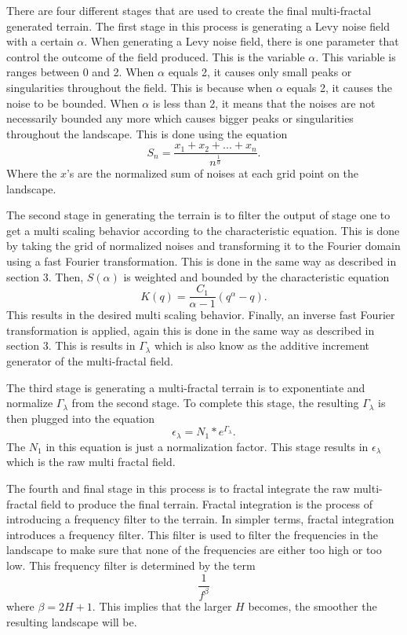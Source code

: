 \documentclass[11pt,twocolumn]{article}
\begin{document}
	There are four different stages that are used to create the final multi-fractal generated terrain. The first stage in this process is
	generating a Levy noise field with a certain $\alpha$. When generating a Levy noise field, there is one parameter that
	control the outcome of the field produced. This is the variable $\alpha$. This variable is ranges between 0 and 2.
	When $\alpha$ equals 2, it causes only small peaks or singularities throughout the field. This is because when $\alpha$ equals 2,
	it causes the noise to be bounded. When $\alpha$ is less than 2, it means that the noises are not necessarily
	bounded any more which causes bigger peaks or singularities throughout the landscape.
	This is done using the equation
	\begin{equation}
	{S_{n}} = \frac{{x_{1}} + {x_{2}} + ... + {x_{n}}}{n^{\frac{1}{\alpha}}}.
	\end{equation}
	Where the $x$'s are the normalized sum of noises at each grid point on the landscape.
	
	The second stage in generating the terrain is to filter the output of stage one to get a multi scaling behavior according to the
	characteristic equation. This is done by taking the grid of normalized noises and transforming it to the Fourier domain using a
	fast Fourier transformation. This is done in the same way as described in section 3. Then, $S(\alpha)$ is weighted and
	bounded by the characteristic equation
	\begin{equation}
	K(q) = \frac{C_{1}}{\alpha - 1}\left(q^{\alpha} - q\right).
	\end{equation}
	 This results in the
	desired multi scaling behavior. Finally, an inverse fast Fourier transformation is applied, again this is done in the same
	way as described in section 3. This is results in $\Gamma_{\lambda}$ which is also know as the additive increment generator of
	the multi-fractal field.
	
	The third stage is generating a multi-fractal terrain is to exponentiate and normalize $\Gamma_{\lambda}$ from the second stage.
	To complete this stage, the resulting $\Gamma_\lambda$ is then plugged into the equation
	\begin{equation}
	{\epsilon_{\lambda}} = {N_{1}} * e^{{\Gamma_{\lambda}}}.
	\end{equation}
	The $N_{1}$ in this equation is just a normalization factor.
	This stage results in $\epsilon_{\lambda}$ which is the raw multi fractal field. 
	
	The fourth and final stage in this process is to fractal integrate the raw multi-fractal field to produce the final terrain.
	Fractal integration is the process of introducing a frequency filter to the terrain. In simpler terms, fractal integration introduces a frequency filter. This filter is used to filter the frequencies in the landscape to make sure that none of the frequencies
	are either too high or too low.  This frequency filter is determined by the term
	\begin{equation}
	\frac{1}{f^{\beta}}
	\end{equation}
	where $\beta = 2H + 1$. This implies that the larger $H$ becomes, the smoother the resulting landscape will be. 
\end{document}
